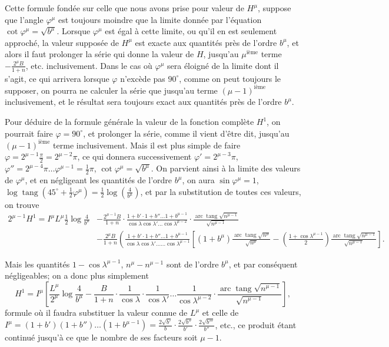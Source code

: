 \documentclass{article}
\begin{document}
Cette formule fondée sur celle que nous avons prise pour valeur de $H^{\mu}$, suppose que l'angle $\varphi^{\mu}$ est toujours moindre que la limite donnée par l'équation $\cot\varphi^{\mu}=\sqrt{b^{\mu}}$. Lorsque $\varphi^{\mu}$ est égal à cette limite, ou qu'il en est seulement approché, la valeur supposée de $H^{\mu}$ est exacte aux quantités près de l'ordre $b^{\mu}$, et alors il faut prolonger la série qui donne la valeur de $H$, jusqu'au $\mu^{\text{ième}}$ terme $-\frac{2^{\mu}B}{1+n}$, etc. inclusivement. Dans le cas où $\varphi^{\mu}$ sera éloigné de la limite dont il s'agit, ce qui arrivera lorsque $\varphi$ n'excède pas $90^{\circ}$, comme on peut toujours le supposer, on pourra ne calculer la série que jusqu'au terme $(\mu-1)^{\text{ième}}$ inclusivement, et le résultat sera toujours exact aux quantités près de l'ordre $b^{\mu}$.

Pour déduire de la formule générale la valeur de la fonction complète $H^{1}$, on pourrait faire $\varphi=90^{\circ}$, et prolonger la série, comme il vient d'être dit, jusqu'au $(\mu-1)^{\text{ième}}$ terme inclusivement. Mais il est plus simple de faire $\varphi=2^{\mu-1}\frac{\pi}{2}=2^{\mu-2}\pi$, ce qui donnera successivement $\varphi'=2^{\mu-3}\pi$, $\varphi''=2^{\mu-4}\pi\ldots\varphi^{\mu-1}=\tfrac{1}{2}\pi$, $\cot\varphi^{\mu}=\sqrt{b^{\mu}}$. On parvient ainsi à la limite des valeurs de $\varphi^{\mu}$, et en négligeant les quantités de l'ordre $b^{\mu}$, on aura $\sin\varphi^{\mu}=1$, $\log\operatorname{tang}(45^{\circ}+\tfrac{1}{2}\varphi^{\mu})=\tfrac{1}{2}\log\left(\frac{4}{b^{\mu}}\right)$, et par la substitution de toutes ces valeurs, on trouve
\[ \begin{aligned} 2^{\mu-1}H^{1}=I^{\mu}L^{\mu}\tfrac{1}{2}\log\frac{4}{b^{\mu}}&-\frac{2^{\mu-1}B}{1+n}\cdot\frac{1+b'\cdot 1+b''\ldots 1+b^{\mu-1}}{\cos\lambda\cos\lambda'\ldots\cos\lambda^{\mu-2}}\cdot\frac{\operatorname{arc}\operatorname{tang}\sqrt{n^{\mu-1}}}{\sqrt{n^{\mu-1}}}\\ &-\frac{2^{\mu}B}{1+n}\left(\frac{1+b'\cdot 1+b''\ldots 1+b^{\mu-1}}{\cos\lambda\cos\lambda'\ldots\ldots\cos\lambda^{\mu-1}}\left[(1+b^{\mu})\frac{\operatorname{arc}\operatorname{tang}\sqrt{n^{\mu}}}{\sqrt{n^{\mu}}}-\left(\frac{1+\cos\lambda^{\mu-1}}{2}\right)\frac{\operatorname{arc}\operatorname{tang}\sqrt{n^{\mu-1}}}{\sqrt{n^{\mu-1}}}\right]. \right. \end{aligned} \]

Mais les quantités $1-\cos\lambda^{\mu-1}$, $n^{\mu}-n^{\mu-1}$ sont de l'ordre $b^{\mu}$, et par conséquent négligeables; on a donc plus simplement
\[ H^{1}=I^{\mu}\left[\frac{L^{\mu}}{2^{\mu}}\log\frac{4}{b^{\mu}}-\frac{B}{1+n}\cdot\frac{1}{\cos\lambda}\cdot\frac{1}{\cos\lambda'}\ldots\frac{1}{\cos\lambda^{\mu-2}}\cdot\frac{\operatorname{arc}\operatorname{tang}\sqrt{n^{\mu-1}}}{\sqrt{n^{\mu-1}}}\right], \]
formule où il faudra substituer la valeur connue de $L^{\mu}$ et celle de $I^{\mu}=(1+b')(1+b'')\ldots(1+b^{\mu-1})=\frac{2\sqrt{b'}}{b}\cdot\frac{2\sqrt{b''}}{b'}\cdot\frac{2\sqrt{b'''}}{b''}$, etc., ce produit étant continué jusqu'à ce que le nombre de ses facteurs soit $\mu-1$.
\end{document}

